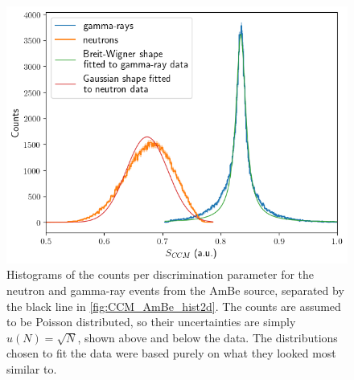 \documentclass[11pt]{article}
\numberwithin{equation}{section}
\numberwithin{figure}{section}
\numberwithin{table}{section}
\begin{document}
\begin{figure}[H]
    \begin{center}
        \includegraphics[scale=0.75]{Plots/CCM_AmBe_separation_hist.png}
        \caption{Histograms of the counts per discrimination parameter for the neutron and gamma-ray events from the AmBe source, separated by the black line in \cref{fig:CCM_AmBe_hist2d}. The counts are assumed to be Poisson distributed, so their uncertainties are simply $u(N)=\sqrt{N}$, shown above and below the data. The distributions chosen to fit the data were based purely on what they looked most similar to.}
        \label{fig:CCM_AmBe_separation_hist}
    \end{center}
\end{figure}
\end{document}
